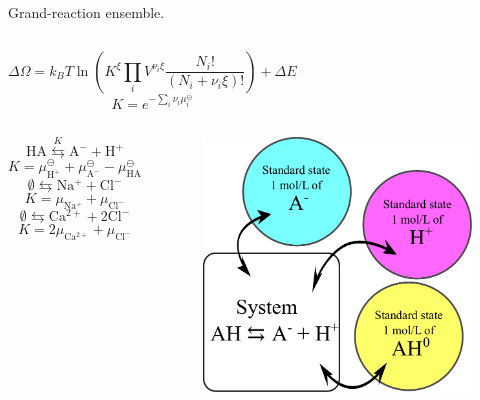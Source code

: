 \documentclass[10pt]{beamer}
\newcommand{\cl}{\mathrm{Cl^-}}
\newcommand{\na}{\mathrm{Na^+}}
\newcommand{\h}{\mathrm{H^+}}
\newcommand{\ca}{\mathrm{Ca^{2+}}}
\begin{document}
\begin{frame}{Grand-reaction ensemble.}
\begin{columns}[T,onlytextwidth]%
\begin{equation*}\boxed{
\Delta\Omega=k_BT\ln\left(K^\xi\prod_i V^{\nu_i\xi}\frac{N_i!}{\left(N_i+\nu_i\xi\right)!}\right)+\Delta E}
\end{equation*}
\begin{equation*}\boxed{
K = e^{-\sum_i\nu_i \mu_i^\ominus }} 
\end{equation*}
\end{columns} %

\vspace{0.6cm}
\begin{columns}[T,onlytextwidth]%
	\begin{equation*}
		\mathrm{HA}\stackrel{K}{\leftrightarrows}\mathrm{A^-}+\mathrm{H^+} 
	\end{equation*}
	\begin{equation*}
		K= \mu_\h^\ominus+\mu_\mathrm{A^-}^\ominus - \mu_\mathrm{HA}^\ominus
	\end{equation*}
	\vspace{0.2cm}
\begin{equation*}
\emptyset \leftrightarrows  \na  +\cl
\end{equation*}
\begin{equation*}
K= \mu_\na+\mu_\cl
\end{equation*}
\vspace{0.2cm}
\begin{equation*}
\emptyset \leftrightarrows \ca + 2\cl
\end{equation*}
\begin{equation*}
K= 2\mu_\ca+\mu_\cl
\end{equation*}
			\begin{figure}
				\includegraphics[height=4.cm]{figures/standard_states.pdf}
			\end{figure} 
\end{columns} %

\end{frame}
\end{document}
